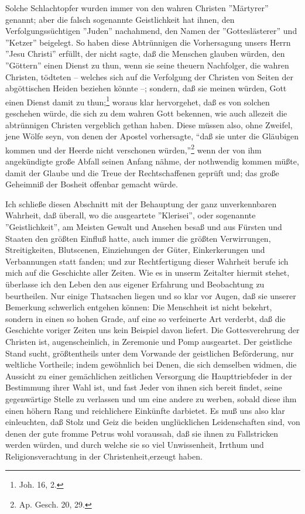 Solche Schlachtopfer wurden immer von den wahren Christen ''Märtyrer'' genannt;
aber die falsch sogenannte Geistlichkeit hat ihnen, den Verfolgungssüchtigen
''Juden'' nachahmend, den Namen der ''Gotteslästerer'' und ''Ketzer'' beigelegt.
So haben diese Abtrünnigen die Vorhersagung unsers Herrn ''Jesu Christi''
erfüllt, der nicht sagte, daß die Menschen glauben würden, den ''Göttern'' einen
Dienst zu thun, wenn sie seine theuern Nachfolger, die wahren Christen, tödteten
-- welches sich auf die Verfolgung der Christen von Seiten der abgöttischen
Heiden beziehen könnte --; sondern, daß sie meinen würden, Gott einen Dienst
damit zu thun;\footnote{Joh. 16, 2.} woraus klar hervorgehet, daß es von solchen
geschehen würde, die sich zu dem wahren Gott bekennen, wie auch allezeit die
abtrünnigen Christen vergeblich gethan haben. Diese müssen also, ohne Zweifel,
jene Wölfe seyn, von denen der Apostel vorhersagte, "`daß sie unter die
Gläubigen kommen und der Heerde nicht verschonen würden,"'\footnote{Ap. Gesch.
20, 29.} wenn der von ihm angekündigte große Abfall seinen Anfang nähme, der
nothwendig kommen müßte, damit der Glaube und die Treue der Rechtschaffenen
geprüft und; das große Geheimniß der Bosheit offenbar gemacht würde.

Ich schließe diesen Abschnitt mit der Behauptung der ganz unverkennbaren
Wahrheit, daß überall, wo die ausgeartete ''Klerisei'', oder sogenannte
''Geistlichkeit'', am Meisten Gewalt und Ansehen besaß und aus Fürsten und
Staaten den größten Einfluß hatte, auch immer die größten Verwirrungen,
Streitigkeiten, Blutscenen, Einziehungen der Güter, Einkerkerungen und
Verbannungen statt fanden; und zur Rechtfertigung dieser Wahrheit berufe ich
mich auf die Geschichte aller Zeiten. Wie es in unserm Zeitalter hiermit stehet,
überlasse ich den Leben den aus eigener Erfahrung und Beobachtung zu
beurtheilen. Nur einige Thatsachen liegen und so klar vor Augen, daß sie unserer
Bemerkung schwerlich entgehen können: Die Menschheit ist nicht bekehrt, sondern
in einen so hohen Grade, auf eine so verfeinerte Art verderbt, daß die
Geschichte voriger Zeiten uns kein Beispiel davon liefert. Die Gottesverehrung
der Christen ist, augenscheinlich, in Zeremonie und Pomp ausgeartet. Der
geistliche Stand sucht, größtentheils unter dem Vorwande der geistlichen
Beförderung, nur weltliche Vortheile; indem gewöhnlich bei Denen, die sich
demselben widmen, die Aussicht zu einer gemächlichen zeitlichen Versorgung die
Haupttriebfeder in der Bestimmung ihrer Wahl ist, und fast Jeder von ihnen sich
bereit findet, seine gegenwärtige Stelle zu verlassen und um eine andere zu
werben, sobald diese ihm einen höhern Rang und reichlichere Einkünfte darbietet.
Es muß uns also klar einleuchten, daß Stolz und Geiz die beiden unglücklichen
Leidenschaften sind, von denen der gute fromme Petrus wohl voraussah, daß sie
ihnen zu Fallstricken werden würden, und durch welche sie so viel Unwissenheit,
Irrthum und Religionsverachtung in der Christenheit,erzeugt haben.


